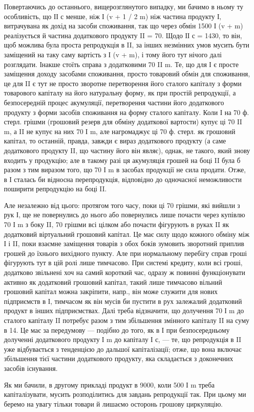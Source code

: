 Повертаючись до останнього, вищерозглянутого випадку, ми бачимо
в ньому ту особливість, що ІІ с менше, ніж І (v + 1 / 2 m) ніж частина
продукту І, витрачувана як дохід на засоби споживання, так що через
обмін 1500 І (v + m) реалізується й частина додаткового продукту II = 70.
Щодо ІІ с = 1430, то він, щоб можлива була проста репродукція в II,
за інших незмінних умов мусить бути заміщений на таку саму вартість
з І (v + m), і тому його тут нічого далі розглядати. Інакше стоїть
справа з додатковими 70 II m. Те, що для І є просте заміщення доходу
засобами споживання, просто товаровий обмін для споживання, це для II
є тут не просто зворотне перетворення його сталого капіталу з форми
товарового капіталу на його натуральну форму, як при простій репродукції,
а безпосередній процес акумуляції, перетворення частини його
додаткового продукту з форми засобів споживання на форму сталого
капіталу. Коли І на 70 ф. стерл. грішми (грошовий резерв для обміну
додаткової вартости) купує ці 70 II m, а II не купує на них 70 І m, але
нагромаджує ці 70 ф. стерл. як грошовий капітал, то останній, правда,
завжди є вираз додаткового продукту (а саме додаткового продукту II,
що частину його він являє), однак, не такого, який знову входить у
продукцію; але в такому разі ця акумуляція грошей на боці II була б
разом з тим виразом того, що 70 І m в засобах продукції не сила продати.
Отже, в І сталась би відносна перепродукція, відповідно до одночасної
неможливости поширити репродукцію на боці II.

Але незалежно від цього: протягом того часу, поки ці 70 грішми,
які вийшли з рук І, ще не повернулись до нього або повернулись лише
почасти через купівлю 70 І m з боку II, 70 грішми всі цілком або почасти
фігурують в руках II як додатковий віртуальний грошовий капітал.
Це має силу щодо кожного обміну між І і II, поки взаємне заміщення
товарів з обох боків зумовить зворотний приплив грошей до їхнього
вихідного пункту. Але при нормальному перебігу справ гроші
фігурують тут в цій ролі лише тимчасово. При системі кредиту, коли
всі гроші, додатково звільнені хоч на самий короткий час, одразу ж повинні
функціонувати активно як додатковий грошовий капітал, такий лише
тимчасово вільний грошовий капітал можна закріпити, напр., він може
служити для нових підприємств в І, тимчасом як він мусів би пустити в
рух залежалий додатковий продукт в інших підприємствах. Далі треба
відзначити, що долучення 70 І m до сталого капіталу II потребує разом
з тим збільшення змінного капіталу II на суму в 14. Це має за передумову
— подібно до того, як в І при безпосередньому долученні додаткового
продукту І m до капіталу І с, — те, що репродукція в II уже відбувається
з тенденцією до дальшої капіталізації; отже, що вона включає збільшення
тієї частини додаткового продукту, яка складається з доконечних засобів
існування.

Як ми бачили, в другому прикладі продукт в 9000, коли 500 І m
треба капіталізувати, мусить розподілитись для завдань репродукції так.
При цьому ми беремо на увагу тільки товари й лишаємо осторонь грошову
циркуляцію.
